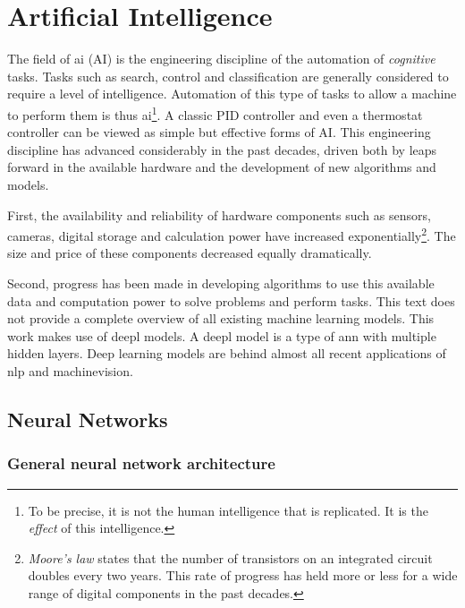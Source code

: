 \section{Artificial Intelligence}
\par{
    The field of \Gls{ai} (AI) is the engineering discipline of the automation of \textit{cognitive} tasks.
    Tasks such as search, control and classification are generally considered to require a level of intelligence. 
    Automation of this type of tasks to allow a machine to perform them is thus \Gls{ai}\footnote{To be precise, it is not the human intelligence that is replicated. It is the \textit{effect} of this intelligence.}.
    A classic PID controller and even a thermostat controller can be viewed as simple but effective forms of AI.
    This engineering discipline has advanced considerably in the past decades, driven both by leaps forward in the available hardware and the development of new algorithms and models. 
}
\par{
    First, the availability and reliability of hardware components such as sensors, cameras, digital storage and calculation power have increased exponentially\footnote{ \textit{Moore's law} states that the number of transistors on an integrated circuit doubles every two years. This rate of progress has held more or less for a wide range of digital components in the past decades.}.
    The size and price of these components decreased equally dramatically. }
\par{
    Second, progress has been made in developing algorithms to use this available data and computation power to solve problems and perform tasks.
    This text does not provide a complete overview of all existing machine learning models. 
    This work makes use of \Gls{deepl} models.
    A \Gls{deepl} model is a type of \acrfull{ann} with multiple hidden layers. 
    Deep learning models are behind almost all recent applications of \acrfull{nlp} and \Gls{machinevision}.
}

\subsection{Neural Networks}
\subsubsection{General neural network architecture}

